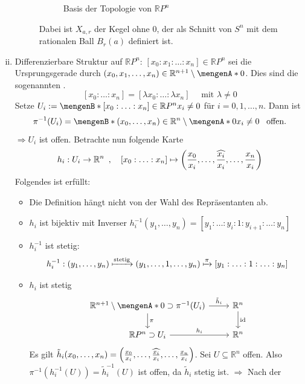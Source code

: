 \begin{enumerate}[(i)]
\begin{description}
\begin{figure}[H]
{
			\caption{Basis der Topologie von $\mathds{R}P^n$}}
		\end{figure}
		Dabei ist $X_{a,r}$ der Kegel ohne $0$, der als Schnitt von $S^n$ mit dem rationalen Ball $B_r(a)$ definiert ist.  
	\end{description}
	\item Differenzierbare Struktur auf $\mathds{R}P^n$: $[x_0 : x_1 : \ldots : x_n] \in \mathds{R}P^n$ sei die Ursprungsgerade durch $(x_0, x_1, \ldots , x_n) \in
	\mathds{R}^{n+1} \setminus \set{0}$. Dies sind die sogenannten .
	\[
		[x_0 : \ldots : x_n] = [\lambda x_0 : \ldots : \lambda x_n] \quad \text{ mit } \lambda \not= 0
	\]
	Setze $U_i := \set[{[x_0 : \ldots : x_n] \in \mathds{R}P^n}]{x_i \not= 0} $ für $i=0,1,\ldots ,n$. Dann ist
	\[
		\pi  ^{-1} (U_i) = \set[(x_0, \ldots , x_n) \in \mathds{R}^n \setminus \set{0} ]{x_i \not= 0}  \enspace\text{ offen.}
	\]
	$\Rightarrow U_i$ ist offen. Betrachte nun folgende Karte
	\[
		h_i : U_i \to \mathds{R}^n \enspace, \quad [x_0 : \ldots : x_n] \mapsto \enbrace*{ \frac{x_0}{x_i}, \ldots , \widehat{\frac{x_i}{x_i}}, \ldots , \frac{x_n}{x_i}   } 
	\]
	Folgendes ist erfüllt:
	\begin{itemize}
		\item Die Definition hängt nicht von der Wahl des Repräsentanten ab.
		\item $h_i$ ist bijektiv mit Inverser $h_i ^{-1} (y_1, \ldots , y_n) = [y_1 : \ldots  : y_i : 1 : y_{i+1} : \ldots : y_n]$
		\item $h_i ^{-1}$ ist stetig: 
		\[
			h_i ^{-1} : (y_1, \ldots , y_n) \xmapsto{\text{stetig}} (y_1, \ldots ,1, \ldots , y_n) \xmapsto{\pi } [y_1 : \ldots : 1 : \ldots : y_n]
		\]
		\item $h_i$ ist stetig
		\[
			\begin{tikzcd}
				\mathds{R}^{n+1} \setminus \set{0} \supset \pi  ^{-1} (U_i) \rar{\tilde h_i} \dar{\pi } & \mathds{R}^n \dar{\id} \\ 
				\mathds{R}P^n \supset U_i \rar{h_i} & \mathds{R}^n 
			\end{tikzcd}
		\]
		Es gilt $\tilde h_i (x_0, \ldots , x_n) = \enbrace*{\frac{x_0}{x_i}, \ldots , \widehat{\frac{x_i}{x_i} }, \ldots , \frac{x_n}{x_i}  } $. 
		Sei $U \subseteq  \mathds{R}^n$ offen. Also $\pi  ^{-1} ( h_i ^{-1} ( U)) = \tilde h_i ^{-1}(U)$ ist offen, da $\tilde h_i$ stetig ist. $\Rightarrow $ Nach der

\end{itemize}
\end{enumerate}

